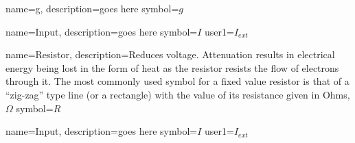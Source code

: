 \documentclass[../doc.tex]{subfiles}
\begin{document}
{
  name=g,
  description={goes here}
 symbol={\ensuremath{g}}              
}

{
  name=Input,
  description={goes here}
  symbol={\ensuremath{I}}
  user1={\ensuremath{I_{ext}}}              
}

{
  name=Resistor,
  description={Reduces voltage. Attenuation results in electrical energy being lost in the form of heat as the resistor resists the flow of electrons through it. The most commonly used symbol for a fixed value resistor is that of a “zig-zag” type line (or a rectangle) with the value of its resistance given in Ohms, $\Omega$}
  symbol={\ensuremath{R}}
}

{
  name=Input,
  description={goes here}
  symbol={\ensuremath{I}}
  user1={\ensuremath{I_{ext}}}              
}
\end{document}

